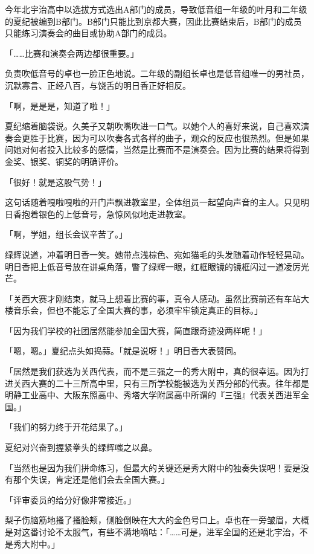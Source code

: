 \documentclass[UTF8]{ctexart}
\begin{document}
    今年北宇治高中以选拔方式选出A部门的成员，导致低音组一年级的叶月和二年级的夏纪被编到B部门。B部门只能比到京都大赛，因此比赛结束后，B部门的成员只能练习演奏会的曲目或协助A部门的成员。 

    「……比赛和演奏会两边都很重要。」 

    负责吹低音号的卓也一脸正色地说。二年级的副组长卓也是低音组唯一的男社员，沉默寡言、正经八百，与饶舌的明日香正好相反。 

    「啊，是是是，知道了啦！」 

    夏纪缩着脑袋说。久美子又朝吹嘴吹进一口气。以她个人的喜好来说，自己喜欢演奏会更胜于比赛，因为可以吹奏各式各样的曲子，观众的反应也很热烈。但是如果问她对何者投入比较多的感情，当然是比赛而不是演奏会。因为比赛的结果将得到金奖、银奖、铜奖的明确评价。 

    「很好！就是这股气势！」 

    这句话随着嘎啦嘎啦的开门声飘进教室里，全体组员一起望向声音的主人。只见明日香抱着银色的上低音号，急惊风似地走进教室。 

    「啊，学姐，组长会议辛苦了。」 

    绿辉说道，冲着明日香一笑。她带点浅棕色、宛如猫毛的头发随着动作轻轻晃动。明日香把上低音号放在讲桌角落，瞥了绿辉一眼，红框眼镜的镜框闪过一道凌厉光芒。 

    「关西大赛才刚结束，就马上想着比赛的事，真令人感动。虽然比赛前还有车站大楼音乐会，但也不能忘了全国大赛的事，必须牢牢锁定真正的目标。」 

    「因为我们学校的社团居然能参加全国大赛，简直跟奇迹没两样呢！」 

    「嗯，嗯。」夏纪点头如捣蒜。「就是说呀！」明日香大表赞同。 

    「居然是我们获选为关西代表，而不是三强之一的秀大附中，真的很幸运。因为打进关西大赛的二十三所高中里，只有三所学校能被选为关西分部的代表。往年都是明静工业高中、大阪东照高中、秀塔大学附属高中所谓的『三强』代表关西进军全国。」 

    「我们的努力终于开花结果了。」 

    夏纪对兴奋到握紧拳头的绿辉嗤之以鼻。 

    「当然也是因为我们拼命练习，但最大的关键还是秀大附中的独奏失误吧！要是没有那个失误，肯定还是他们会去全国大赛。」 

    「评审委员的给分好像非常接近。」 

    梨子伤脑筋地搔了搔脸颊，侧脸倒映在大大的金色号口上。卓也在一旁皱眉，大概是对这番讨论不太服气，有些不满地嘀咕：「……可是，进军全国的还是北宇治，不是秀大附中。」 
\end{document}
